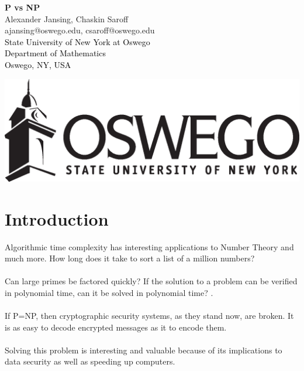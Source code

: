 \documentclass[14pt]{article}
\newcommand{\Black}{\textcolor{Black}}
\theoremstyle{definition}
\theoremstyle{definition}
\begin{document}
\LARGE
\begin{center}
\Large \textbf{P vs NP} \normalsize \\
Alexander Jansing, Chaskin Saroff\\
ajansing@oswego.edu, csaroff@oswego.edu\\
\Black{ \hspace{0 in} State University of New York at Oswego\\ \hspace{0 in} Department of Mathematics\hspace{3.1 in}
\\Oswego, NY, USA\\}
\end{center}
\vspace*{.5 cm}
\includegraphics[scale=.75]{oswego_logo_horiz_blk}
\vspace*{.5 cm}



\section*{Introduction}
Algorithmic time complexity has interesting applications to Number Theory and much more.  How long does it take to sort a list of a million numbers?  
\\
\\
Can  large primes be factored quickly?  If the solution to a problem can be verified in polynomial time, can it be solved in polynomial time?  \cite{CD}.
\\
\\
If P=NP, then cryptographic security systems, as they stand now, are broken.  It is as easy to decode encrypted messages as it to encode them.
\\
\\
Solving this problem is interesting and valuable because of its implications to data security as well as speeding up computers.
\\
\\
\end{document}
